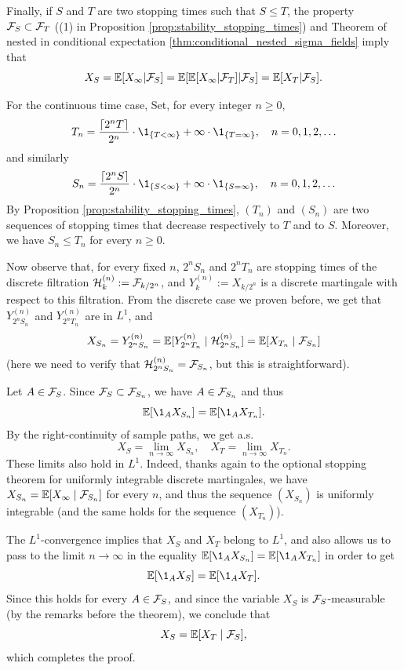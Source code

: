 \documentclass[../Main.tex]{subfiles}
\begin{document}
{    Finally, if $S$ and $T$ are two stopping times such that $S \le T$, the property $\mathcal{F}_S \subset \mathcal{F}_T$ ((1) in Proposition \ref{prop:stability_stopping_times}) and Theorem of nested \sfields in conditional expectation \ref{thm:conditional_nested_sigma_fields} imply that
    \[     X_S = \mathbb{E}[X_\infty | \mathcal{F}_S] = \mathbb{E}[\mathbb{E}[X_\infty | \mathcal{F}_T] | \mathcal{F}_S] = \mathbb{E}[X_T | \mathcal{F}_S].     \]

    For the continuous time case, Set, for every integer $n \geq 0$,
    \[   T_n=  \frac{\lceil 2^n T \rceil}{2^n}\cdot \1_{\{T<\infty\}}+\infty \cdot \1_{\{T=\infty\}}, \quad n=0,1,2, \ldots     \]
    and similarly
    \[    S_n=  \frac{\lceil 2^n S \rceil}{2^n}\cdot \1_{\{S<\infty\}}+\infty \cdot \1_{\{S=\infty\}}, \quad n=0,1,2, \ldots \]
    By Proposition \ref{prop:stability_stopping_times}, $(T_n)$ and $(S_n)$ are two sequences of stopping times that decrease respectively to $T$ and to $S$. Moreover, we have $S_n \leq T_n$ for every $n \geq 0$.

    Now observe that, for every fixed $n$, $2^n S_n$ and $2^n T_n$ are stopping times of the discrete filtration $\mathcal{H}_k^{(n)} := \mathcal{F}_{k/2^n}$, and $Y_k^{(n)} := X_{k/2^n}$ is a discrete martingale with respect to this filtration. From the discrete case we proven before, we get that $Y_{2^n S_n}^{(n)}$ and $Y_{2^n T_n}^{(n)}$ are in $L^1$, and
    \[ X_{S_n} = Y_{2^n S_n}^{(n)} = \mathbb{E}[Y_{2^n T_n}^{(n)} \mid \mathcal{H}_{2^n S_n}^{(n)}] = \mathbb{E}[X_{T_n} \mid \mathcal{F}_{S_n}] \]
    (here we need to verify that $\mathcal{H}_{2^n S_n}^{(n)} = \mathcal{F}_{S_n}$, but this is straightforward).

    Let $A \in \mathcal{F}_S$. Since $\mathcal{F}_S \subset \mathcal{F}_{S_n}$, we have $A \in \mathcal{F}_{S_n}$ and thus
    \[ \EE[\1_A X_{S_n}] = \EE[\1_A X_{T_n}].\]
    By the right-continuity of sample paths, we get a.s.
    \[ X_S = \lim_{n \to \infty} X_{S_n}, \quad X_T = \lim_{n \to \infty} X_{T_n}. \]
    These limits also hold in $L^1$. Indeed, thanks again to the optional stopping theorem for uniformly integrable discrete martingales, we have $X_{S_n} = \mathbb{E}[X_\infty \mid \mathcal{F}_{S_n}]$ for every $n$, and thus the sequence $(X_{S_n})$ is uniformly integrable (and the same holds for the sequence $(X_{T_n})$).

    The $L^1$-convergence implies that $X_S$ and $X_T$ belong to $L^1$, and also allows us to pass to the limit $n \to \infty$ in the equality $\EE[\1_A X_{S_n}] = \EE[\1_A X_{T_n}]$ in order to get
    \[
    \EE[\1_A X_S] = \EE[\1_A X_T].
    \]
    Since this holds for every $A \in \mathcal{F}_S$, and since the variable $X_S$ is $\mathcal{F}_S$-measurable (by the remarks before the theorem), we conclude that
    \[
    X_S = \mathbb{E}[X_T \mid \mathcal{F}_S],
    \]
    which completes the proof.
}
\end{document}
